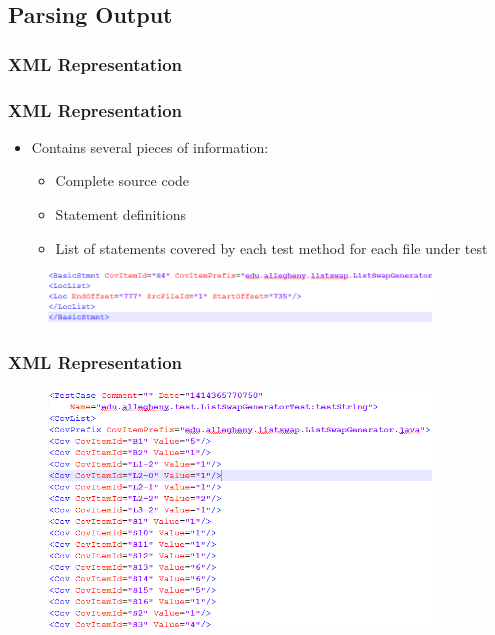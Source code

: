 \documentclass{beamer}
\begin{document}
	\subsection{Parsing Output}
	\subsubsection{XML Representation}
	\begin{frame}
	\frametitle{XML Representation}
	\begin{itemize}
    	\item Contains several pieces of information:
    	\pause
    	\begin{itemize}
    		\item Complete source code
    		\item Statement definitions
    		\item List of statements covered by each test method for each file under test
    		\pause
    	\end{itemize}
	\end{itemize}
	\begin{figure}
		\label{xmlstat}
		\includegraphics[width=4in]{img/xmlstatement}
	\end{figure}
	\end{frame}	
	\begin{frame}
	\frametitle{XML Representation}
	  	\begin{figure}
	  		\label{xmlcov}
	  		\includegraphics[width=4in]{img/xmlcoverage}
	  	\end{figure}
	\end{frame}
\end{document}
